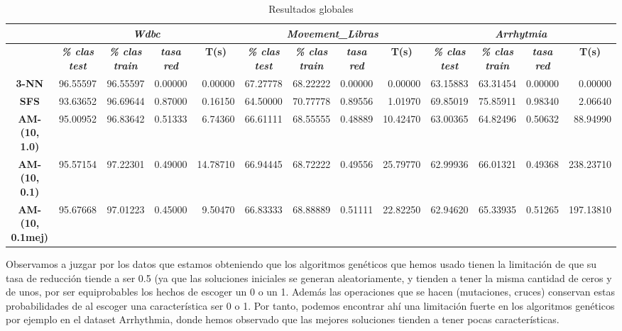 \documentclass[a4paper,11pt]{article}
\begin{document}
  
  \begin{table}[H]
  \caption{Resultados globales}
  \begin{adjustbox}{width=1.1\textwidth}
  \begin{tabular}{|c|r|r|r|r|r|r|r|r|r|r|r|r|}
  \hline
  \multicolumn{1}{|l|}{} & \multicolumn{ 4}{c|}{\textbf{\textit{Wdbc}}} & \multicolumn{ 4}{c|}{\textbf{\textit{Movement\_Libras}}} & \multicolumn{ 4}{c|}{\textbf{\textit{Arrhytmia}}} \\ \hline
  \multicolumn{1}{|l|}{} & \multicolumn{1}{c|}{\textbf{\textit{\% clas test}}} & \multicolumn{1}{c|}{\textbf{\textit{\% clas train}}} & \multicolumn{1}{c|}{\textbf{\textit{tasa red}}} & \multicolumn{1}{c|}{\textbf{T(s)}} & \multicolumn{1}{c|}{\textbf{\textit{\% clas test}}} & \multicolumn{1}{c|}{\textbf{\textit{\% clas train}}} & \multicolumn{1}{c|}{\textbf{\textit{tasa red}}} & \multicolumn{1}{c|}{\textbf{T(s)}} & \multicolumn{1}{c|}{\textbf{\textit{\% clas test}}} & \multicolumn{1}{c|}{\textbf{\textit{\% clas train}}} & \multicolumn{1}{c|}{\textbf{\textit{tasa red}}} & \multicolumn{1}{c|}{\textbf{T(s)}} \\ \hline
  \textbf{3-NN} & 96.55597 & 96.55597 & 0.00000 & 0.00000 & 67.27778 & 68.22222 & 0.00000 & 0.00000 & 63.15883 & 63.31454 & 0.00000 & 0.00000 \\ \hline
  \textbf{SFS} & 93.63652 & 96.69644 & 0.87000 & 0.16150 & 64.50000 & 70.77778 & 0.89556 & 1.01970 & 69.85019 & 75.85911 & 0.98340 & 2.06640 \\ \hline
  \textbf{AM-(10, 1.0)} & 95.00952 & 96.83642 & 0.51333 & 6.74360 & 66.61111 & 68.55555 & 0.48889 & 10.42470 & 63.00365 & 64.82496 & 0.50632 & 88.94990 \\ \hline
  \textbf{AM-(10, 0.1)} & 95.57154 & 97.22301 & 0.49000 & 14.78710 & 66.94445 & 68.72222 & 0.49556 & 25.79770 & 62.99936 & 66.01321 & 0.49368 & 238.23710 \\ \hline
  \textbf{AM-(10, 0.1mej)} & 95.67668 & 97.01223 & 0.45000 & 9.50470 & 66.83333 & 68.88889 & 0.51111 & 22.82250 & 62.94620 & 65.33935 & 0.51265 & 197.13810 \\ \hline
  \end{tabular}
  \end{adjustbox}
  \label{all}
  \end{table}
  
  Observamos a juzgar por los datos que estamos obteniendo que los algoritmos genéticos que hemos usado tienen la limitación
  de que su tasa de reducción tiende a ser 0.5 (ya que las soluciones iniciales se generan aleatoriamente, y tienden a tener
  la misma cantidad de ceros y de unos, por ser equiprobables los hechos de escoger un 0 o un 1. Además las operaciones que se
  hacen (mutaciones, cruces) conservan estas probabilidades de al escoger una característica ser 0 o 1. Por tanto, podemos
  encontrar ahí una limitación fuerte en los algoritmos genéticos por ejemplo en el dataset Arrhythmia, donde hemos observado
  que las mejores soluciones tienden a tener pocas características.
  
\end{document}
